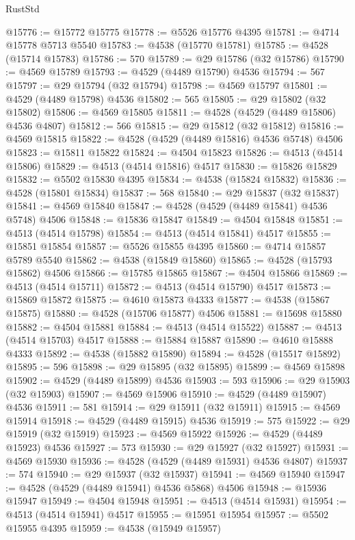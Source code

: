 \begin{lexlean}{RustStd}
\begin{coremodule}
@15776 := @15772 @15775
@15778 := @5526 @15776 @4395
@15781 := @4714 @15778 @5713 @5540
@15783 := @4538 (@15770 @15781)
@15785 := @4528 (@15714 @15783)
@15786 := 570
@15789 := @29 @15786 (@32 @15786)
@15790 := @4569 @15789
@15793 := @4529 (@4489 @15790) @4536
@15794 := 567
@15797 := @29 @15794 (@32 @15794)
@15798 := @4569 @15797
@15801 := @4529 (@4489 @15798) @4536
@15802 := 565
@15805 := @29 @15802 (@32 @15802)
@15806 := @4569 @15805
@15811 := @4528 (@4529 (@4489 @15806) @4536 @4807)
@15812 := 566
@15815 := @29 @15812 (@32 @15812)
@15816 := @4569 @15815
@15822 := @4528 (@4529 (@4489 @15816) @4536 @5748) @4506
@15823 := @15811 @15822
@15824 := @4504 @15823
@15826 := @4513 (@4514 @15806)
@15829 := @4513 (@4514 @15816) @4517
@15830 := @15826 @15829
@15832 := @5502 @15830 @4395
@15834 := @4538 (@15824 @15832)
@15836 := @4528 (@15801 @15834)
@15837 := 568
@15840 := @29 @15837 (@32 @15837)
@15841 := @4569 @15840
@15847 := @4528 (@4529 (@4489 @15841) @4536 @5748) @4506
@15848 := @15836 @15847
@15849 := @4504 @15848
@15851 := @4513 (@4514 @15798)
@15854 := @4513 (@4514 @15841) @4517
@15855 := @15851 @15854
@15857 := @5526 @15855 @4395
@15860 := @4714 @15857 @5789 @5540
@15862 := @4538 (@15849 @15860)
@15865 := @4528 (@15793 @15862) @4506
@15866 := @15785 @15865
@15867 := @4504 @15866
@15869 := @4513 (@4514 @15711)
@15872 := @4513 (@4514 @15790) @4517
@15873 := @15869 @15872
@15875 := @4610 @15873 @4333
@15877 := @4538 (@15867 @15875)
@15880 := @4528 (@15706 @15877) @4506
@15881 := @15698 @15880
@15882 := @4504 @15881
@15884 := @4513 (@4514 @15522)
@15887 := @4513 (@4514 @15703) @4517
@15888 := @15884 @15887
@15890 := @4610 @15888 @4333
@15892 := @4538 (@15882 @15890)
@15894 := @4528 (@15517 @15892)
@15895 := 596
@15898 := @29 @15895 (@32 @15895)
@15899 := @4569 @15898
@15902 := @4529 (@4489 @15899) @4536
@15903 := 593
@15906 := @29 @15903 (@32 @15903)
@15907 := @4569 @15906
@15910 := @4529 (@4489 @15907) @4536
@15911 := 581
@15914 := @29 @15911 (@32 @15911)
@15915 := @4569 @15914
@15918 := @4529 (@4489 @15915) @4536
@15919 := 575
@15922 := @29 @15919 (@32 @15919)
@15923 := @4569 @15922
@15926 := @4529 (@4489 @15923) @4536
@15927 := 573
@15930 := @29 @15927 (@32 @15927)
@15931 := @4569 @15930
@15936 := @4528 (@4529 (@4489 @15931) @4536 @4807)
@15937 := 574
@15940 := @29 @15937 (@32 @15937)
@15941 := @4569 @15940
@15947 := @4528 (@4529 (@4489 @15941) @4536 @5868) @4506
@15948 := @15936 @15947
@15949 := @4504 @15948
@15951 := @4513 (@4514 @15931)
@15954 := @4513 (@4514 @15941) @4517
@15955 := @15951 @15954
@15957 := @5502 @15955 @4395
@15959 := @4538 (@15949 @15957)

\end{coremodule}
\end{lexlean}

